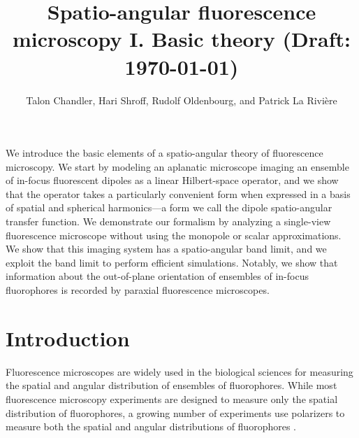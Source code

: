 \documentclass[]{osa-article}
\begin{document}
\title{Spatio-angular fluorescence microscopy I. Basic theory (Draft: \today)}

\author{Talon Chandler, Hari Shroff, Rudolf Oldenbourg, and Patrick La Rivi\`ere}

\address{University of Chicago, Department of Radiology, Chicago, Illinois 60637, USA\\
  Section on High Resolution Optical Imaging, National Institute
  of Biomedical Imaging and Bioengineering, National Institutes of Health,
  Bethesda, Maryland 20892, USA\\
  Marine Biological Laboratory, Bell Center, Woods Hole, Massachusetts 02543, USA
}




\begin{abstract*}
  We introduce the basic elements of a spatio-angular theory of fluorescence
  microscopy. We start by modeling an aplanatic microscope imaging an ensemble
  of in-focus fluorescent dipoles as a linear Hilbert-space operator, and we
  show that the operator takes a particularly convenient form when expressed in
  a basis of spatial and spherical harmonics---a form we call the dipole
  spatio-angular transfer function. We demonstrate our formalism by analyzing a
  single-view fluorescence microscope without using the monopole or scalar
  approximations. We show that this imaging system has a spatio-angular band
  limit, and we exploit the band limit to perform efficient simulations.
  Notably, we show that information about the out-of-plane orientation of
  ensembles of in-focus fluorophores is recorded by paraxial fluorescence
  microscopes.
\end{abstract*}

\section{Introduction}
Fluorescence microscopes are widely used in the biological sciences for
measuring the spatial and angular distribution of ensembles of fluorophores.
While most fluorescence microscopy experiments are designed to measure only the
spatial distribution of fluorophores, a growing number of experiments use
polarizers to measure both the spatial and angular distributions of fluorophores
\cite{vrabioiu2006, mattheyses2010, mehta2016, mcquilken2017, zhanghao2017}.
\end{document}
